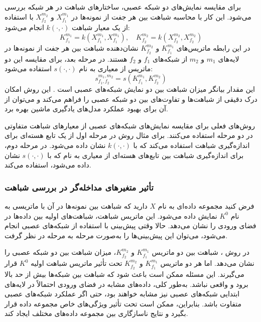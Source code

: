برای مقایسه نمایش‌های دو شبکه عصبی، ساختارهای شباهت در هر شبکه بررسی می‌شود. این کار با محاسبه شباهت بین هر جفت از نمونه‌ها در \(X^{m_1}_{f_1}\) و \(X^{m_2}_{f_2}\) با استفاده از یک معیار شباهت \( k(\cdot, \cdot) \) انجام می‌شود:
\begin{equation}
	K^{m_1}_{f_1} = k(X^{m_1}_{f_1}, X^{m_1}_{f_1}), \quad K^{m_2}_{f_2} = k(X^{m_2}_{f_2}, X^{m_2}_{f_2})
	\label{eq_dCKA_Kernel}
\end{equation}
در این رابطه ماتریس‌های \(K^{m_1}_{f_1}\) و \(K^{m_2}_{f_2}\) نشان‌دهنده شباهت بین هر جفت از نمونه‌ها در لایه‌های \(m_1\) و \(m_2\) از شبکه‌های \(f_1\) و \(f_2\) هستند. در مرحله بعد، برای مقایسه این دو ماتریس از معیاری به نام \(s(\cdot, \cdot)\) استفاده می‌شود:
\begin{equation}
	s^{m_1,m_2}_{f_1,f_2} = s(K^{m_1}_{f_1}, K^{m_2}_{f_2})
	\label{eq_similarity}
\end{equation}
این مقدار بیانگر میزان شباهت بین دو نمایش شبکه‌های عصبی است
\cite{cui2022deconfounded}.
این روش امکان درک دقیقی از شباهت‌ها و تفاوت‌های بین دو شبکه عصبی را فراهم می‌کند و می‌توان از آن برای بهبود عملکرد مدل‌های یادگیری ماشین بهره برد.

روش‌های فعلی برای مقایسه نمایش‌های شبکه‌های عصبی از معیارهای شباهت متفاوتی در دو مرحله استفاده می‌کنند. برای مثال روش
در مرحله اول از یک تابع هسته‌ای برای اندازه‌گیری شباهت استفاده می‌کند که با \( k(\cdot,\cdot) \) نشان داده می‌شود. در مرحله دوم، برای اندازه‌گیری شباهت بین تابع‌های هسته‌ای از معیاری به نام
که با \( s(\cdot,\cdot) \) نشان داده می‌شود، استفاده می‌کند.



\subsubsection{
	تأثیر متغیرهای مداخله‌گر%
	در بررسی شباهت
}

فرض کنید مجموعه داده‌ای به نام \(X\) دارید که شباهت بین نمونه‌ها در آن با ماتریسی به نام
\( K^0 \)
نمایش داده می‌شود. این ماتریس شباهت، شباهت‌های اولیه بین داده‌ها در فضای ورودی را نشان می‌دهد. حالا وقتی پیش‌بینی با استفاده از شبکه‌های عصبی انجام می‌شود، می‌توان این پیش‌بینی‌ها را به‌صورت مرحله به مرحله در نظر گرفت.

در روش
%
، شباهت بین دو ماتریس \(K_{f_1}^{m_1}\) و \(K_{f_2}^{m_2}\)، میزان شباهت بین دو شبکه عصبی را نشان می‌دهد. اما هر دو ماتریس \(K_{f_1}^{m_1}\) و \(K_{f_2}^{m_2}\) تحت تأثیر ماتریس شباهت اولیه
\( K^0 \)
قرار می‌گیرند. این مسئله ممکن است باعث شود که شباهت بین شبکه‌ها بیش از حد بالا برود و واقعی نباشد. به‌طور کلی، داده‌های مشابه در فضای ورودی احتمالاً در لایه‌های ابتدایی شبکه‌های عصبی نیز مشابه خواهند بود، حتی اگر عملکرد شبکه‌های عصبی متفاوت باشد. بنابراین،
ممکن است تحت تأثیر ویژگی‌های خاص مجموعه داده قرار بگیرد و نتایج ناسازگاری بین مجموعه داده‌های مختلف ایجاد کند.

